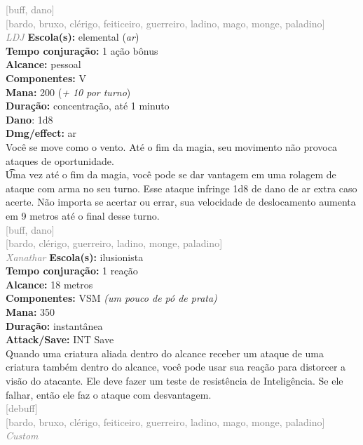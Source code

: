 \documentclass{RPG_Adventure}[2021/10/20]
\begin{document}
{\scriptsize \textcolor{gray}{[buff, dano]\\}}
{\scriptsize \textcolor{gray}{[bardo, bruxo, clérigo, feiticeiro, guerreiro, ladino, mago, monge, paladino]\\}}
{\tiny \textcolor{gray}{\textit{LDJ}}}
{\small \t \textbf{Escola(s):} elemental (\textit{ar})\\\t \textbf{Tempo conjuração:} 1 ação bônus\\\t \textbf{Alcance:} pessoal\\\t \textbf{Componentes:} V\\\t \textbf{Mana:} 200 (\textit{+ 10 por turno})\\\t \textbf{Duração:} concentração, até 1 minuto\\\t \textbf{Dano}: 1d8\\\t \textbf{Dmg/effect:} ar\\}
{\normalsize Você se move como o vento. Até o fim da magia, seu movimento não provoca ataques de oportunidade.\\\t Uma vez até o fim da magia, você pode se dar vantagem em uma rolagem de ataque com arma no seu turno. Esse ataque infringe 1d8 de dano de ar extra caso acerte. Não importa se acertar ou errar, sua velocidade de deslocamento aumenta em 9 metros até o final desse turno.\\}
{\scriptsize \textcolor{gray}{[buff, dano]\\}}
{\scriptsize \textcolor{gray}{[bardo, clérigo, guerreiro, ladino, monge, paladino]\\}}
{\tiny \textcolor{gray}{\textit{Xanathar}}}
{\small \t \textbf{Escola(s):} ilusionista\\\t \textbf{Tempo conjuração:} 1 reação\\\t \textbf{Alcance:} 18 metros\\\t \textbf{Componentes:} VSM \textit{(um pouco de pó de prata)}\\\t \textbf{Mana:} 350\\\t \textbf{Duração:} instantânea\\\t \textbf{Attack/Save:} INT Save\\}
{\normalsize Quando uma criatura aliada dentro do alcance receber um ataque de uma criatura também dentro do alcance, você pode usar sua reação para distorcer a visão do atacante. Ele deve fazer um teste de resistência de Inteligência. Se ele falhar, então ele faz o ataque com desvantagem.\\}
{\scriptsize \textcolor{gray}{[debuff]\\}}
{\scriptsize \textcolor{gray}{[bardo, bruxo, clérigo, feiticeiro, guerreiro, ladino, mago, monge, paladino]\\}}
{\tiny \textcolor{gray}{\textit{Custom}}}\jump

\end{document}
